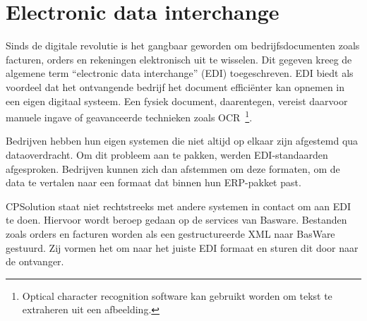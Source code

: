 \section{Electronic data interchange}
\label{sec:electronic-data-interchange}
Sinds de digitale revolutie is het gangbaar geworden om bedrijfsdocumenten zoals facturen, orders en rekeningen elektronisch uit te wisselen. Dit gegeven kreeg de algemene term ``electronic data interchange'' (EDI) toegeschreven. 
EDI biedt als voordeel dat het ontvangende bedrijf het document efficiënter kan opnemen in een eigen digitaal systeem. Een fysiek document, daarentegen, vereist daarvoor manuele ingave of geavanceerde technieken zoals OCR~\footnote{Optical character recognition software kan gebruikt worden om tekst te extraheren uit een afbeelding.}.

Bedrijven hebben hun eigen systemen die niet altijd op elkaar zijn afgestemd qua dataoverdracht. Om dit probleem aan te pakken, werden EDI-standaarden afgesproken. Bedrijven kunnen zich dan afstemmen om deze formaten, om de data te vertalen naar een formaat dat binnen hun ERP-pakket past.

CPSolution staat niet rechtstreeks met andere systemen in contact om aan EDI te doen. Hiervoor wordt beroep gedaan op de services van Basware. Bestanden zoals orders en facturen worden als een gestructureerde XML naar BasWare gestuurd. Zij vormen het om naar het juiste EDI formaat en sturen dit door naar de ontvanger.

